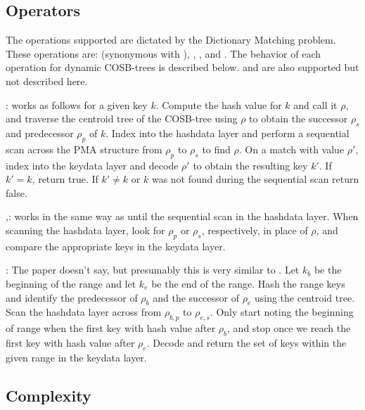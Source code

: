 \documentclass{style}
\begin{document}
\subsection{Operators}


The operations supported are dictated by the Dictionary Matching problem.
These operations are: \Search{} (synonymous with \Member{}), \Pred{}, \Succ{},
and \Range{}. The behavior of each operation for dynamic COSB-trees is
described below. \Insertkonly{} and \Delete{} are also supported but not
described here.

\Search{}: works as follows for a given key $k$. Compute the hash value for
$k$ and call it $\rho$, and traverse the centroid tree of the COSB-tree using
$\rho$ to obtain the successor $\rho_{s}$ and predecessor $\rho_{p}$ of $k$.
Index into the hashdata layer and perform a sequential scan across the PMA
structure from $\rho_{p}$ to $\rho_{s}$ to find $\rho$. On a match with value
$\rho'$, index into the keydata layer and decode $\rho'$ to obtain the
resulting key $k'$. If $k' = k$, return true. If $k' \ne k$ or $k$ was not
found during the sequential scan return false.

\Pred{},\Succ{}: works in the same way as \Search{} until the sequential scan
in the hashdata layer. When scanning the hashdata layer, look for $\rho_{p}$
or $\rho_{s}$, respectively, in place of $\rho$, and compare the appropriate
keys in the keydata layer.

\Range{}: The paper doesn't say, but presumably this is very similar to
\Search{}. Let $k_{b}$ be the beginning of the range and let $k_{e}$ be the
end of the range. Hash the range keys and identify the predecessor of
$\rho_{b}$ and the successor of $\rho_{e}$ using the centroid tree. Scan the
hashdata layer across from $\rho_{b,p}$ to $\rho_{e,s}$. Only start noting the
beginning of range when the first key with hash value after $\rho_{b}$, and
stop once we reach the first key with hash value after $\rho_{e}$. Decode and
return the set of keys within the given range in the keydata layer.

\subsection{Complexity}
\end{document}
